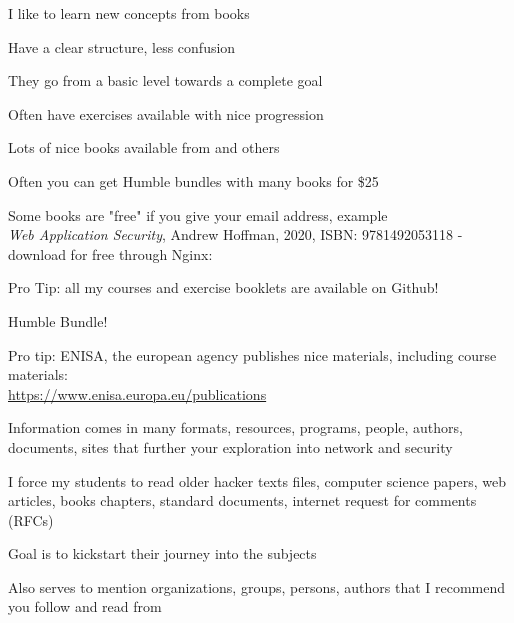 \documentclass[Screen16to9,17pt]{foils}
\begin{document}
I like to learn new concepts from books
\begin{list2}
\item Have a clear structure, less confusion
\item They go from a basic level towards a complete goal
\item Often have exercises available with nice progression
\item Lots of nice books available from  and others
\item Often you can get Humble bundles with many books for \$25
\item Some books are "free" if you give your email address, example\\
\emph{Web Application Security}, Andrew Hoffman, 2020, ISBN: 9781492053118 - download for free through Nginx:\\
\end{list2}

Pro Tip: all my courses and exercise booklets are available on Github!

Humble Bundle!






Pro tip: ENISA, the european agency publishes nice materials, including course materials:\\
\url{https://www.enisa.europa.eu/publications}

\begin{quote}

\end{quote}

\begin{list2}
\item Information comes in many formats, resources, programs, people, authors, documents, sites
that further your exploration into network and security

\item I force my students to read older hacker texts files, computer science papers, web articles, books chapters, standard documents, internet request for comments (RFCs)

\item Goal is to kickstart their journey into the subjects

\item Also serves to mention organizations, groups, persons, authors that I recommend you follow and read from
\end{list2}
\end{document}
